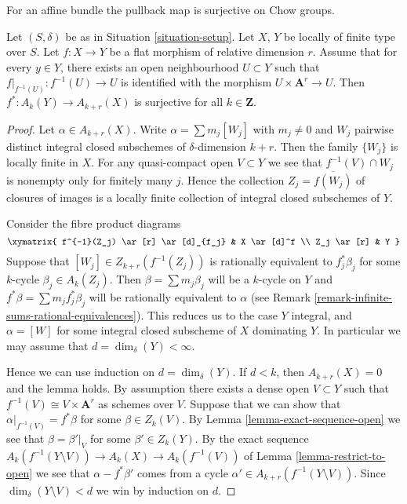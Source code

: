 \noindent
For an affine bundle the pullback map is surjective on Chow groups.

\begin{lemma}
\label{lemma-pullback-affine-fibres-surjective}
Let $(S, \delta)$ be as in Situation \ref{situation-setup}.
Let $X$, $Y$ be locally of finite type over $S$.
Let $f : X \to Y$ be a flat morphism of relative dimension $r$.
Assume that for every $y \in Y$, there exists an open neighbourhood
$U \subset Y$ such that $f|_{f^{-1}(U)} : f^{-1}(U) \to U$
is identified with the morphism $U \times \mathbf{A}^r \to U$.
Then $f^* : A_k(Y) \to A_{k + r}(X)$ is surjective for all
$k \in \mathbf{Z}$.
\end{lemma}

\begin{proof}
Let $\alpha \in A_{k + r}(X)$.
Write $\alpha = \sum m_j[W_j]$ with $m_j \not = 0$ and
$W_j$ pairwise distinct integral closed subschemes of
$\delta$-dimension $k + r$. Then the family $\{W_j\}$
is locally finite in $X$. For any quasi-compact open
$V \subset Y$ we see that $f^{-1}(V) \cap W_j$
is nonempty only for finitely many $j$. Hence the
collection $Z_j = \overline{f(W_j)}$ of closures
of images is a locally finite collection of integral
closed subschemes of $Y$.

\medskip\noindent
Consider the fibre product diagrams
$$
\xymatrix{
f^{-1}(Z_j) \ar[r] \ar[d]_{f_j} & X \ar[d]^f \\
Z_j \ar[r] & Y
}
$$
Suppose that $[W_j] \in Z_{k + r}(f^{-1}(Z_j))$
is rationally equivalent to $f_j^*\beta_j$ for some
$k$-cycle $\beta_j \in A_k(Z_j)$. Then
$\beta = \sum m_j \beta_j$ will be a $k$-cycle on $Y$
and $f^*\beta = \sum m_j f_j^*\beta_j$ will be rationally
equivalent to $\alpha$ (see
Remark \ref{remark-infinite-sums-rational-equivalences}).
This reduces us to the case $Y$ integral, and
$\alpha = [W]$ for some integral closed subscheme
of $X$ dominating $Y$. In particular we may
assume that $d = \dim_\delta(Y) < \infty$.

\medskip\noindent
Hence we can use induction on $d = \dim_\delta(Y)$.
If $d < k$, then $A_{k + r}(X) = 0$ and the lemma holds.
By assumption there exists a dense open $V \subset Y$ such
that $f^{-1}(V) \cong V \times \mathbf{A}^r$ as schemes over $V$.
Suppose that we can show that $\alpha|_{f^{-1}(V)} = f^*\beta$
for some $\beta \in Z_k(V)$. By Lemma \ref{lemma-exact-sequence-open}
we see that
$\beta = \beta'|_V$ for some $\beta' \in Z_k(Y)$.
By the exact sequence
$A_k(f^{-1}(Y \setminus V)) \to A_k(X) \to A_k(f^{-1}(V))$
of Lemma \ref{lemma-restrict-to-open}
we see that $\alpha - f^*\beta'$ comes from
a cycle $\alpha' \in A_{k + r}(f^{-1}(Y \setminus V))$.
Since $\dim_\delta(Y \setminus V) < d$ we win by
induction on $d$.


\end{proof}

